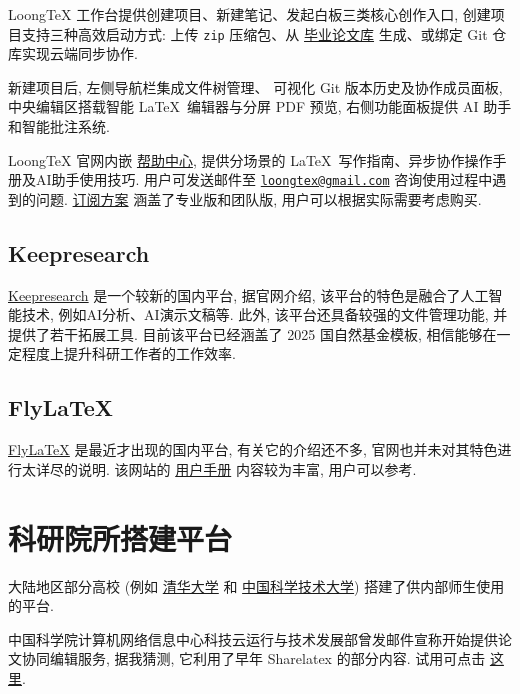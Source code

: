 LoongTeX 工作台提供创建项目、新建笔记、发起白板三类核心创作入口,
创建项目支持三种高效启动方式: 上传 \texttt{zip} 压缩包、从%
\href{https://www.loongtex.com/templates/}{毕业论文库}%
生成、或绑定 Git 仓库实现云端同步协作.

新建项目后, 左侧导航栏集成文件树管理、
可视化 Git 版本历史及协作成员面板,
中央编辑区搭载智能 \LaTeX\ 编辑器与分屏 PDF 预览,
右侧功能面板提供 AI 助手和智能批注系统.

LoongTeX 官网内嵌%
\href{https://www.loongtex.com/docs/app/help/}{帮助中心},
提供分场景的 \LaTeX\ 写作指南、异步协作操作手册及AI助手使用技巧.
用户可发送邮件至
\href{mailto:loongtex@gmail.com}{\texttt{loongtex@gmail.com}}
咨询使用过程中遇到的问题.
\href{https://www.loongtex.com/pricing}{订阅方案}%
涵盖了专业版和团队版,
用户可以根据实际需要考虑购买.

\subsection{Keepresearch}

\href{https://www.keepresearch.com/}{Keepresearch} 是一个较新的国内平台,
据官网介绍,
该平台的特色是融合了人工智能技术,
例如AI分析、AI演示文稿等.
此外,
该平台还具备较强的文件管理功能,
并提供了若干拓展工具.
目前该平台已经涵盖了 2025 国自然基金模板,
相信能够在一定程度上提升科研工作者的工作效率.

\subsection{FlyLaTeX}

\href{https://flylatex.cn/}{FlyLaTeX} 是最近才出现的国内平台,
有关它的介绍还不多,
官网也并未对其特色进行太详尽的说明.
该网站的%
\href{https://www.flylatex.cn/pdf-viewer.html?pdf=./Files/FlyLaTeX.pdf}{用户手册}%
内容较为丰富,
用户可以参考.

\section{科研院所搭建平台}

大陆地区部分高校 (例如%
\href{https://overleaf.tsinghua.edu.cn/login}{清华大学}%
和%
\href{https://latex.ustc.edu.cn/login}{中国科学技术大学}) 搭建了供内部师生使用的平台.

中国科学院计算机网络信息中心科技云运行与技术发展部曾发邮件宣称开始提供论文协同编辑服务,
据我猜测,
它利用了早年 Sharelatex 的部分内容.
试用可点击%
\href{https://www.cstcloud.cn/resources/452}{这里}.
